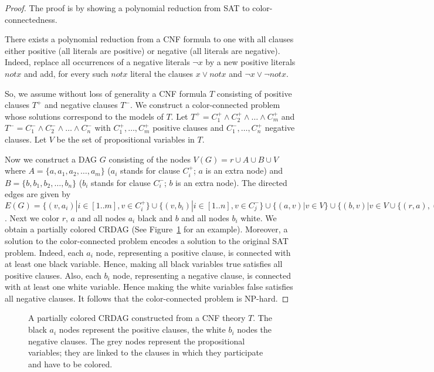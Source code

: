 \documentclass{tlp}
\renewcommand{\|}{\ensuremath{\,|\,}}
\renewcommand{\|}{\,|\,}
\begin{document}
\begin{proof}
  The proof is  by showing a polynomial reduction from SAT to
  color-connectedness.

  There exists a polynomial reduction from a CNF formula to one with
  all clauses either positive (all literals are positive) or negative
  (all literals are negative). Indeed, replace all occurrences of a
  negative literals $\neg x$ by a new positive literals $notx$ and
  add, for every such $notx$ literal the clauses $x \vee notx$ and
  $\neg x \vee \neg notx$.

  So, we assume without loss of generality a CNF formula $T$
  consisting of positive clauses $T^+$ and negative clauses $T^-$. We
  construct a color-connected problem whose solutions correspond to
  the models of $T$.
%
  Let $T^+ = C^+_1 \wedge C^+_2 \wedge \ldots \wedge C^+_m$ and $T^- =
  C^-_1 \wedge C^-_2 \wedge \ldots \wedge C^-_n$ with $C^+_1 , \ldots,
  C^+_m$ positive clauses and $C^-_1, \ldots, C^+_n$ negative clauses.
  Let $V$ be the set of propositional variables in $T$.

  Now we construct a DAG $G$ consisting of the nodes $V(G) = {r} \cup A \cup B \cup
  V$ where $A=\{a, a_1, a_2, \ldots ,a_m\}$ ($a_i$ stands for clause
  $C^+_i$; $a$ is an extra node) and $B=\{b, b_1, b_2, \ldots
  ,b_{n}\}$ ($b_i$ stands for clause $C^-_i$; $b$ is an  extra
  node). The directed edges are given by $E(G) =\{(v,a_i) | i \in
  [1..m], v \in C^+_i\} \cup \{(v,b_i) | i \in [1..n], v \in C^-_j\}
  \cup \{(a,v)| v \in V\} \cup \{(b,v)| v \in V \cup \{(r,a),(r,b)\} $
  .  Next we color $r$, $a$ and all nodes $a_i$ black and $b$ and all
  nodes $b_i$ white. We obtain %
  a partially colored CRDAG (See Figure~\ref{example-CRDAG} for an
  example). Moreover, a solution to the color-connected problem
  encodes a solution to the original SAT problem. Indeed, each $a_i$
  node, representing a positive clause, is connected with at least
  one black variable. Hence, making all black variables true satisfies
  all positive clauses. Also, each $b_i$ node, representing a
  negative clause, is connected with at least one white
  variable. Hence making the white variables false satisfies all
  negative clauses. It follows that the color-connected problem is
  NP-hard.
\end{proof}

\begin{figure}
\caption{A partially colored CRDAG constructed from a CNF theory
  $T$. The black $a_i$ nodes represent the positive clauses, the white
  $b_i$ nodes the negative clauses. The grey nodes represent the
  propositional variables; they are linked to the clauses in which
  they participate and have to be colored.}
\label{example-CRDAG}
\end{figure}
\end{document}
